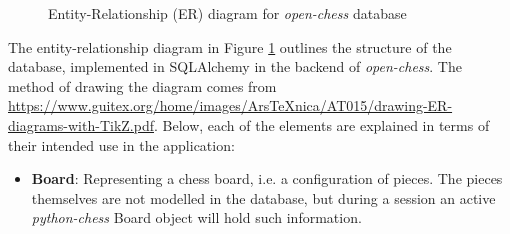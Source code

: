 \documentclass[architecture.tex]{subfiles}
\begin{document}
\begin{figure}[H]

\caption{Entity-Relationship (ER) diagram for \textit{open-chess} database}
\label{fig:er-diagram}
\end{figure}

The entity-relationship diagram in Figure \ref{fig:er-diagram} outlines the structure of the 
database, implemented in SQLAlchemy in the backend of \textit{open-chess}.
The method of drawing the diagram comes from 
\url{https://www.guitex.org/home/images/ArsTeXnica/AT015/drawing-ER-diagrams-with-TikZ.pdf}.
Below, each of the elements are explained in terms of their intended
use in the application:

\begin{itemize}
    \item \textbf{Board}: Representing a chess board, i.e. a configuration
        of pieces. The pieces themselves are not modelled in the database,
        but during a session an active \textit{python-chess} Board
        object will hold such information.


\end{itemize}
\end{document}
